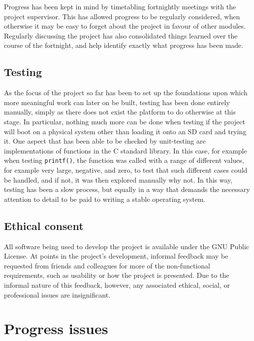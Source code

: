 \documentclass[10pt,a4paper]{article}
\newcommand{\code}[1]{\texttt{#1}}
\begin{document}
Progress has been kept in mind by timetabling fortnightly meetings with the
project supervisor. This has allowed progress to be regularly considered, when
otherwise it may be easy to forget about the project in favour of other modules.
Regularly discussing the project has also consolidated things learned over the
course of the fortnight, and help identify exactly what progress has been made.

\subsection*{Testing}
As the focus of the project so far has been to set up the foundations upon which
more meaningful work can later on be built, testing has been done entirely
manually, simply as there does not exist the platform to do otherwise at this
stage. In particular, nothing much more can be done when testing if the project
will boot on a physical system other than loading it onto an SD card and
trying it. One aspect that has been able to be checked by unit-testing are
implementations of functions in the C standard library. In this case, for
example when testing \code{printf()}, the function was called with a range of
different values, for example very large, negative, and zero, to test that such
different cases could be handled, and if not, it was then explored manually why
not. In this way, testing has been a slow process, but equally in a way that
demands the necessary attention to detail to be paid to writing a stable
operating system.

\subsection*{Ethical consent}
All software being used to develop the project is available under the GNU Public
License. At points in the project's development, informal feedback may be
requested from friends and colleagues for more of the non-functional
requirements, such as usability or how the project is presented. Due to the
informal nature of this feedback, however, any associated ethical, social, or
professional issues are insignificant.

\section*{Progress issues}
\end{document}
